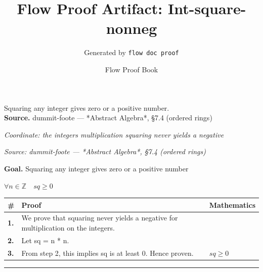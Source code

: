 \documentclass[11pt]{article}
\title{Flow Proof Artifact: Int-square-nonneg}
\author{Generated by \texttt{flow doc proof}}
\date{Flow Proof Book}
\theoremstyle{definition}
\begin{document}
\maketitle
Squaring any integer gives zero or a positive number.\\[0.5em]
\textbf{Source.} dummit-foote — *Abstract Algebra*, §7.4 (ordered rings)\\[0.5em]
\bigskip
{}\par
\smallskip\noindent\textit{Coordinate: the integers \cdot multiplication \cdot squaring never yields a negative}\par
\smallskip\noindent\textit{Source: dummit-foote — *Abstract Algebra*, §7.4 (ordered rings)}\par
\medskip
\noindent\textbf{Goal.} Squaring any integer gives zero or a positive number\par
\noindent$\displaystyle \forall n \in \mathbb{Z}\quad sq \ge 0$\par
\medskip
\noindent
\begin{tabular}{@{} >{\raggedright\arraybackslash}p{} >{\raggedright\arraybackslash}p{} >{\raggedleft\arraybackslash}p{} @{}}
\textbf{\#} & \textbf{Proof} & \textbf{Mathematics} \\
\midrule
\textbf{1.} & We prove that squaring never yields a negative for multiplication on the integers. & \\[0.45em]
\textbf{2.} & Let sq = n * n. & \\[0.45em]
\textbf{3.} & From step 2, this implies sq is at least 0. Hence proven. & $\displaystyle sq \ge 0$ \\[0.45em]
\bottomrule
\end{tabular}
\label{thm:Int-multiplication-squaring_never_yields_a_negative}
\par\medskip\hrule
\end{document}
